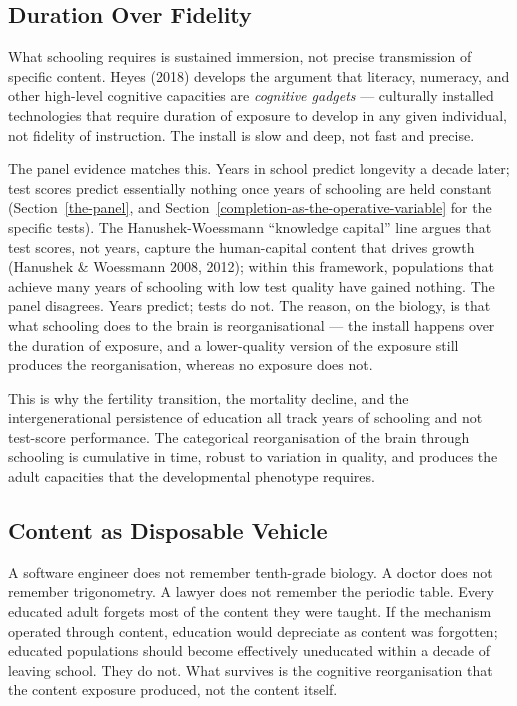 \documentclass[12pt,letterpaper]{article}
\begin{document}
\subsection{Duration Over Fidelity}\label{duration-over-fidelity}

What schooling requires is sustained immersion, not precise
transmission of specific content. Heyes (2018) develops the argument
that literacy, numeracy, and other high-level cognitive capacities
are \emph{cognitive gadgets} --- culturally installed technologies
that require duration of exposure to develop in any given individual,
not fidelity of instruction. The install is slow and deep, not fast
and precise.

The panel evidence matches this. Years in school predict longevity a
decade later; test scores predict essentially nothing once years of
schooling are held constant
(Section~\ref{the-panel}, and
Section~\ref{completion-as-the-operative-variable} for the specific
tests). The Hanushek-Woessmann ``knowledge capital'' line argues that
test scores, not years, capture the human-capital content that drives
growth (Hanushek \& Woessmann 2008, 2012); within this framework,
populations that achieve many years of schooling with low test
quality have gained nothing. The panel disagrees. Years predict; tests
do not. The reason, on the biology, is that what schooling does to
the brain is reorganisational --- the install happens over the
duration of exposure, and a lower-quality version of the exposure
still produces the reorganisation, whereas no exposure does not.

This is why the fertility transition, the mortality decline, and the
intergenerational persistence of education all track years of
schooling and not test-score performance. The categorical
reorganisation of the brain through schooling is cumulative in time,
robust to variation in quality, and produces the adult capacities
that the developmental phenotype requires.

\subsection{Content as Disposable Vehicle}\label{content-as-disposable-vehicle}

A software engineer does not remember tenth-grade biology. A doctor
does not remember trigonometry. A lawyer does not remember the
periodic table. Every educated adult forgets most of the content they
were taught. If the mechanism operated through content, education
would depreciate as content was forgotten; educated populations
should become effectively uneducated within a decade of leaving
school. They do not. What survives is the cognitive reorganisation
that the content exposure produced, not the content itself.
\end{document}
